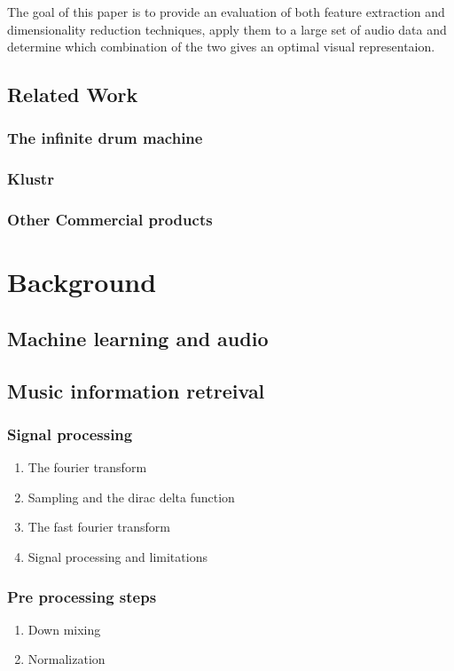 \documentclass[11pt]{article}
\begin{document}
The goal of this paper is to provide an evaluation of both feature extraction and dimensionality reduction techniques, apply them to a large set of audio data and determine which combination of the two gives an optimal visual representaion.

\subsection{Related Work}
\label{sec:org315f66e}
\subsubsection{The infinite drum machine}
\label{sec:org0514ea2}
\subsubsection{Klustr}
\label{sec:orgc9e3102}
\subsubsection{Other Commercial products}
\label{sec:org04050ea}
\section{Background}
\label{sec:orge163353}
\subsection{Machine learning and audio}
\label{sec:orgb5ef080}
\subsection{Music information retreival}
\label{sec:org6652ef8}
\subsubsection{Signal processing}
\label{sec:orgc32d02f}
\begin{enumerate}
\item The fourier transform
\label{sec:orgacfc29a}
\item Sampling and the dirac delta function
\label{sec:org98d0291}
\item The fast fourier transform
\label{sec:orgbdd5d48}
\item Signal processing and limitations
\label{sec:org2514d5d}
\end{enumerate}
\subsubsection{Pre processing steps}
\label{sec:org37b796f}
\begin{enumerate}
\item Down mixing
\label{sec:org363dccb}
\item Normalization
\label{sec:orgb375cef}
\end{enumerate}
\end{document}
